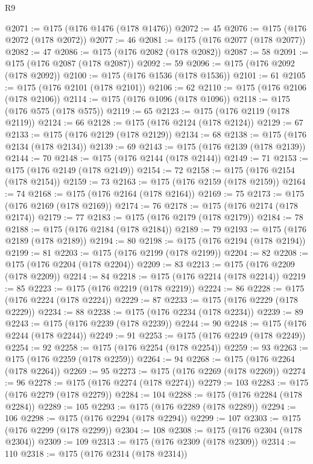 \begin{lexlean}{R9}
\begin{coremodule}
@2071 := @175 (@176 @1476 (@178 @1476))
@2072 := 45
@2076 := @175 (@176 @2072 (@178 @2072))
@2077 := 46
@2081 := @175 (@176 @2077 (@178 @2077))
@2082 := 47
@2086 := @175 (@176 @2082 (@178 @2082))
@2087 := 58
@2091 := @175 (@176 @2087 (@178 @2087))
@2092 := 59
@2096 := @175 (@176 @2092 (@178 @2092))
@2100 := @175 (@176 @1536 (@178 @1536))
@2101 := 61
@2105 := @175 (@176 @2101 (@178 @2101))
@2106 := 62
@2110 := @175 (@176 @2106 (@178 @2106))
@2114 := @175 (@176 @1096 (@178 @1096))
@2118 := @175 (@176 @575 (@178 @575))
@2119 := 65
@2123 := @175 (@176 @2119 (@178 @2119))
@2124 := 66
@2128 := @175 (@176 @2124 (@178 @2124))
@2129 := 67
@2133 := @175 (@176 @2129 (@178 @2129))
@2134 := 68
@2138 := @175 (@176 @2134 (@178 @2134))
@2139 := 69
@2143 := @175 (@176 @2139 (@178 @2139))
@2144 := 70
@2148 := @175 (@176 @2144 (@178 @2144))
@2149 := 71
@2153 := @175 (@176 @2149 (@178 @2149))
@2154 := 72
@2158 := @175 (@176 @2154 (@178 @2154))
@2159 := 73
@2163 := @175 (@176 @2159 (@178 @2159))
@2164 := 74
@2168 := @175 (@176 @2164 (@178 @2164))
@2169 := 75
@2173 := @175 (@176 @2169 (@178 @2169))
@2174 := 76
@2178 := @175 (@176 @2174 (@178 @2174))
@2179 := 77
@2183 := @175 (@176 @2179 (@178 @2179))
@2184 := 78
@2188 := @175 (@176 @2184 (@178 @2184))
@2189 := 79
@2193 := @175 (@176 @2189 (@178 @2189))
@2194 := 80
@2198 := @175 (@176 @2194 (@178 @2194))
@2199 := 81
@2203 := @175 (@176 @2199 (@178 @2199))
@2204 := 82
@2208 := @175 (@176 @2204 (@178 @2204))
@2209 := 83
@2213 := @175 (@176 @2209 (@178 @2209))
@2214 := 84
@2218 := @175 (@176 @2214 (@178 @2214))
@2219 := 85
@2223 := @175 (@176 @2219 (@178 @2219))
@2224 := 86
@2228 := @175 (@176 @2224 (@178 @2224))
@2229 := 87
@2233 := @175 (@176 @2229 (@178 @2229))
@2234 := 88
@2238 := @175 (@176 @2234 (@178 @2234))
@2239 := 89
@2243 := @175 (@176 @2239 (@178 @2239))
@2244 := 90
@2248 := @175 (@176 @2244 (@178 @2244))
@2249 := 91
@2253 := @175 (@176 @2249 (@178 @2249))
@2254 := 92
@2258 := @175 (@176 @2254 (@178 @2254))
@2259 := 93
@2263 := @175 (@176 @2259 (@178 @2259))
@2264 := 94
@2268 := @175 (@176 @2264 (@178 @2264))
@2269 := 95
@2273 := @175 (@176 @2269 (@178 @2269))
@2274 := 96
@2278 := @175 (@176 @2274 (@178 @2274))
@2279 := 103
@2283 := @175 (@176 @2279 (@178 @2279))
@2284 := 104
@2288 := @175 (@176 @2284 (@178 @2284))
@2289 := 105
@2293 := @175 (@176 @2289 (@178 @2289))
@2294 := 106
@2298 := @175 (@176 @2294 (@178 @2294))
@2299 := 107
@2303 := @175 (@176 @2299 (@178 @2299))
@2304 := 108
@2308 := @175 (@176 @2304 (@178 @2304))
@2309 := 109
@2313 := @175 (@176 @2309 (@178 @2309))
@2314 := 110
@2318 := @175 (@176 @2314 (@178 @2314))

\end{coremodule}
\end{lexlean}
